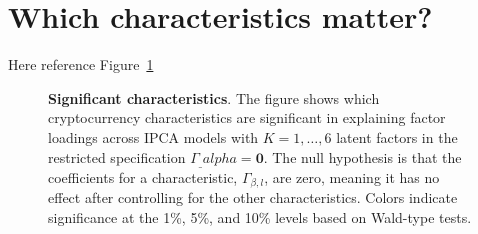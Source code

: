 \documentclass[
  12pt,
  a4paper,
  openany]{scrbook}
\begin{document}
\section{Which characteristics
matter?}\label{which-characteristics-matter}

Here reference Figure~\ref{fig-charsheatmap}

\begin{figure}[h]


\caption[Significant
characteristics]{\label{fig-charsheatmap}\textbf{Significant
characteristics}. The figure shows which cryptocurrency characteristics
are significant in explaining factor loadings across IPCA models with
\(K=1,\dots,6\) latent factors in the restricted specification
\(\Gamma_\_alpha = \mathbf{0}\). The null hypothesis is that the
coefficients for a characteristic, \(\Gamma_{\beta,l}\), are zero,
meaning it has no effect after controlling for the other
characteristics. Colors indicate significance at the 1\%, 5\%, and 10\%
levels based on Wald-type tests.}

\end{figure}%
\end{document}
